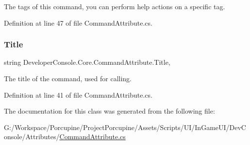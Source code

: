 The tags of this command, you can perform help actions on a specific tag. 



Definition at line 47 of file Command\+Attribute.\+cs.

\mbox{\label{class_developer_console_1_1_core_1_1_command_attribute_a52aa4f325c47ccafda6f68f45b7689b8}} 
\subsubsection{\texorpdfstring{Title}{Title}}
{\footnotesize\ttfamily string Developer\+Console.\+Core.\+Command\+Attribute.\+Title\hspace{0.3cm}{\ttfamily [get]}, {\ttfamily [set]}}



The title of the command, used for calling. 



Definition at line 41 of file Command\+Attribute.\+cs.



The documentation for this class was generated from the following file\+:\begin{DoxyCompactItemize}
\item 
G\+:/\+Workspace/\+Porcupine/\+Project\+Porcupine/\+Assets/\+Scripts/\+U\+I/\+In\+Game\+U\+I/\+Dev\+Console/\+Attributes/\hyperlink{_command_attribute_8cs}{Command\+Attribute.\+cs}\end{DoxyCompactItemize}
